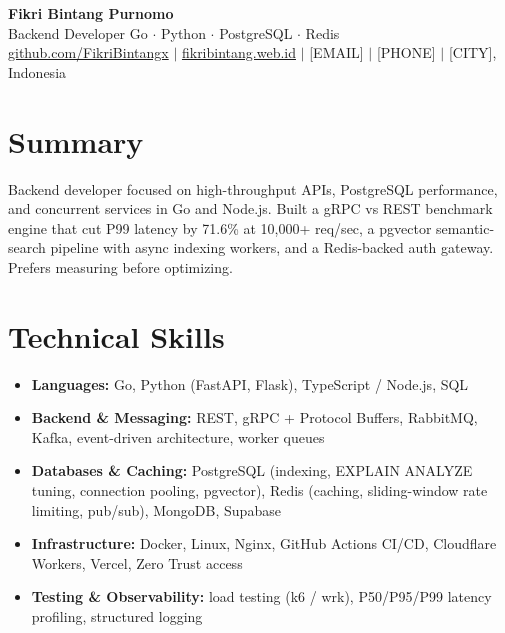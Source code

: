 \documentclass[letterpaper,10.5pt]{article}
\begin{document}
\begin{center}
  {\Huge\bfseries Fikri Bintang Purnomo}\\[3pt]
  Backend Developer \textbar{} Go $\cdot$ Python $\cdot$ PostgreSQL $\cdot$ Redis\\[2pt]
  \small
  \href{https://github.com/FikriBintangx}{github.com/FikriBintangx} $|$
  \href{https://fikribintang.web.id}{fikribintang.web.id} $|$
  [EMAIL] $|$ [PHONE] $|$ [CITY], Indonesia
\end{center}

\section{Summary}
Backend developer focused on high-throughput APIs, PostgreSQL performance, and concurrent services in Go and Node.js. Built a gRPC vs REST benchmark engine that cut P99 latency by 71.6\% at 10,000+ req/sec, a pgvector semantic-search pipeline with async indexing workers, and a Redis-backed auth gateway. Prefers measuring before optimizing.

\section{Technical Skills}
\small
\begin{itemize}
  \item[] \textbf{Languages:} Go, Python (FastAPI, Flask), TypeScript / Node.js, SQL
  \item[] \textbf{Backend \& Messaging:} REST, gRPC + Protocol Buffers, RabbitMQ, Kafka, event-driven architecture, worker queues
  \item[] \textbf{Databases \& Caching:} PostgreSQL (indexing, EXPLAIN ANALYZE tuning, connection pooling, pgvector), Redis (caching, sliding-window rate limiting, pub/sub), MongoDB, Supabase
  \item[] \textbf{Infrastructure:} Docker, Linux, Nginx, GitHub Actions CI/CD, Cloudflare Workers, Vercel, Zero Trust access
  \item[] \textbf{Testing \& Observability:} load testing (k6 / wrk), P50/P95/P99 latency profiling, structured logging
\end{itemize}
\normalsize

\end{document}
